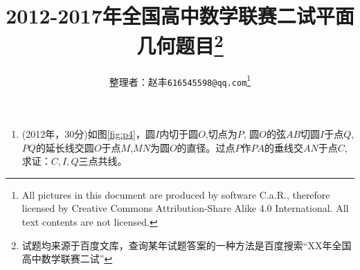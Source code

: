 \documentclass{article}
\begin{document}
\title{2012-2017年全国高中数学联赛二试平面几何题目\footnote{试题均来源于百度文库，查询某年试题答案的一种方法是百度搜索“XX年全国高中数学联赛二试”}}
\author{整理者：赵丰\footnotesize \texttt{616545598@qq.com}\footnote{All pictures in this document are produced by software C.a.R., therefore licensed by  Creative Commons Attribution-Share Alike 4.0 International. All text contents are not licensed.}}
\maketitle

\begin{enumerate}
\item (2012年，30分)如图\ref{fig:p4}，圆$I$内切于圆$O$,切点为$P$, 圆$O$的弦$AB$切圆$I$于点$Q$,
$PQ$的延长线交圆$O$于点$M$,$MN$为圆$O$的直径。过点$P$作$PA$的垂线交$AN$于点$C$,求证：$C,I,Q$三点共线。
  

\end{enumerate}
\end{document}
